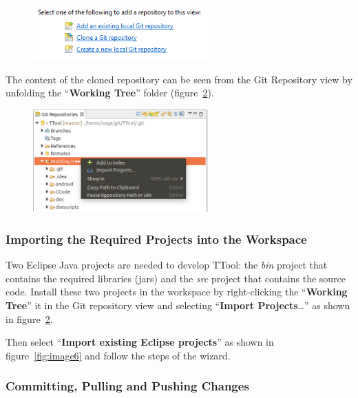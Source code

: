\documentclass[12pt]{article}
\begin{document}
\begin{figure}[H]
\begin{center}
\includegraphics[width=0.6\textwidth]{images/image5.png}
\end{center}
\caption{}
\label{fig:image4}
\end{figure}

The content of the cloned repository can be seen from the Git Repository view by
unfolding the ``\textbf{Working Tree}'' folder (figure~\ref{fig:image5}).

\begin{figure}[H]
\begin{center}
\includegraphics[width=0.6\textwidth]{images/image6.png}
\end{center}
\caption{}
\label{fig:image5}
\end{figure}

\subsubsection{Importing the Required Projects into the Workspace}
\label{sec:import}

Two Eclipse Java projects are needed to develop TTool: the \textit{bin} project
that contains the required libraries (jars) and the \textit{src} project that
contains the source code. Install these two projects in the workspace by
right-clicking the ``\textbf{Working Tree}'' it in the Git repository view and
selecting ``\textbf{Import Projects}\ldots'' as shown in figure~\ref{fig:image5}.

Then select ``\textbf{Import existing Eclipse projects}'' as shown in
figure~\ref{fig:image6} and follow the steps of the wizard.

\subsubsection{Committing, Pulling and Pushing Changes}
\end{document}
